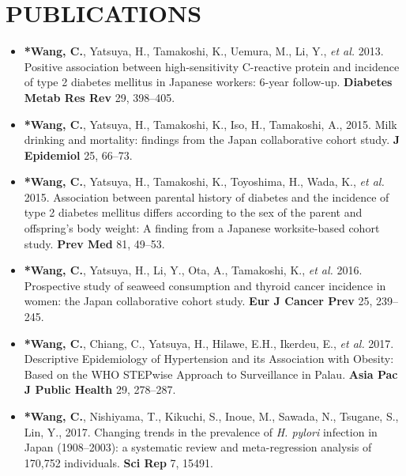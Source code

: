 \documentclass[10pt,]{article}
\providecommand{\tightlist}{%
  \setlength{\itemsep}{0pt}\setlength{\parskip}{0pt}}
\begin{document}
\hypertarget{publications}{%
\section{PUBLICATIONS}\label{publications}}

\begin{itemize}
\tightlist
\item
  \textbf{*Wang, C.}, Yatsuya, H., Tamakoshi, K., Uemura, M., Li, Y.,
  \emph{et al.} 2013. Positive association between high-sensitivity
  C-reactive protein and incidence of type 2 diabetes mellitus in
  Japanese workers: 6-year follow-up. \textbf{Diabetes Metab Res Rev}
  29, 398--405.
\end{itemize}

\begin{itemize}
\item
  \textbf{*Wang, C.}, Yatsuya, H., Tamakoshi, K., Iso, H., Tamakoshi,
  A., 2015. Milk drinking and mortality: findings from the Japan
  collaborative cohort study. \textbf{J Epidemiol} 25, 66--73.
\item
  \textbf{*Wang, C.}, Yatsuya, H., Tamakoshi, K., Toyoshima, H., Wada,
  K., \emph{et al.} 2015. Association between parental history of
  diabetes and the incidence of type 2 diabetes mellitus differs
  according to the sex of the parent and offspring's body weight: A
  finding from a Japanese worksite-based cohort study. \textbf{Prev Med}
  81, 49--53.
\end{itemize}

\begin{itemize}
\tightlist
\item
  \textbf{*Wang, C.}, Yatsuya, H., Li, Y., Ota, A., Tamakoshi, K.,
  \emph{et al.} 2016. Prospective study of seaweed consumption and
  thyroid cancer incidence in women: the Japan collaborative cohort
  study. \textbf{Eur J Cancer Prev} 25, 239--245.
\end{itemize}

\begin{itemize}
\tightlist
\item
  \textbf{*Wang, C.}, Chiang, C., Yatsuya, H., Hilawe, E.H., Ikerdeu,
  E., \emph{et al.} 2017. Descriptive Epidemiology of Hypertension and
  its Association with Obesity: Based on the WHO STEPwise Approach to
  Surveillance in Palau. \textbf{Asia Pac J Public Health} 29, 278--287.
\end{itemize}

\begin{itemize}
\tightlist
\item
  \textbf{*Wang, C.}, Nishiyama, T., Kikuchi, S., Inoue, M., Sawada, N.,
  Tsugane, S., Lin, Y., 2017. Changing trends in the prevalence of
  \emph{H. pylori} infection in Japan (1908--2003): a systematic review
  and meta-regression analysis of 170,752 individuals. \textbf{Sci Rep}
  7, 15491.
\end{itemize}
\end{document}
